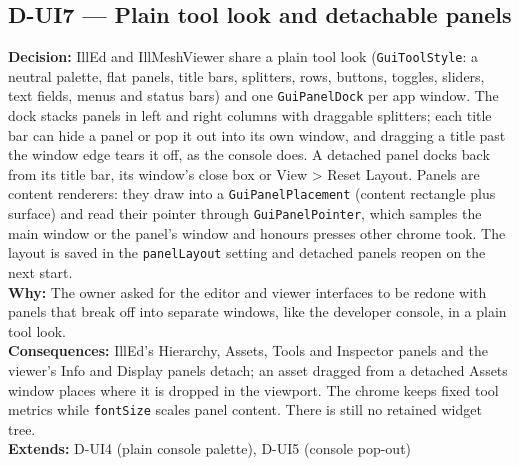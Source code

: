 \subsection*{D-UI7 --- Plain tool look and detachable panels}
\begin{decisionbox}[title={D-UI7 \quad 2026-09-23}]
\textbf{Decision:} IllEd and IllMeshViewer share a plain tool look
(\texttt{GuiToolStyle}: a neutral palette, flat panels, title bars, splitters,
rows, buttons, toggles, sliders, text fields, menus and status bars) and one
\texttt{GuiPanelDock} per app window. The dock stacks panels in left and right
columns with draggable splitters; each title bar can hide a panel or pop it
out into its own window, and dragging a title past the window edge tears it
off, as the console does. A detached panel docks back from its title bar, its
window's close box or View \textgreater{} Reset Layout. Panels are content
renderers: they draw into a \texttt{GuiPanelPlacement} (content rectangle
plus surface) and read their pointer through \texttt{GuiPanelPointer}, which
samples the main window or the panel's window and honours presses other
chrome took. The layout is saved in the \texttt{panelLayout} setting and
detached panels reopen on the next start.\\
\textbf{Why:} The owner asked for the editor and viewer interfaces to be
redone with panels that break off into separate windows, like the developer
console, in a plain tool look.\\
\textbf{Consequences:} IllEd's Hierarchy, Assets, Tools and Inspector panels
and the viewer's Info and Display panels detach; an asset dragged from a
detached Assets window places where it is dropped in the viewport. The chrome
keeps fixed tool metrics while \texttt{fontSize} scales panel content. There
is still no retained widget tree.\\
\textbf{Extends:} D-UI4 (plain console palette), D-UI5 (console pop-out)
\end{decisionbox}

